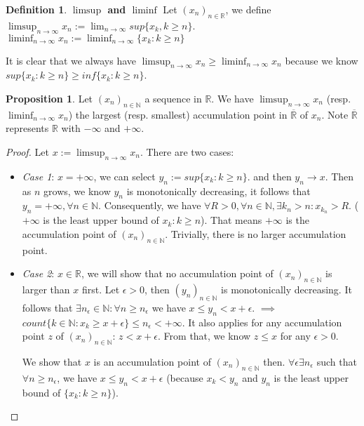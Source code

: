 \documentclass{article}
\theoremstyle{definition}
\newtheorem{defi}{Definition}[subsection]
\newtheorem{prop}{Proposition}[subsection]
\begin{document}
\begin{defi}
\textbf{$\limsup$ and $\liminf$} Let $(x_n)_{n\in\mathbb{R}}$, we define $\limsup_{n\to\infty}x_n := \lim_{n\to\infty}sup\{x_k, k\geq n\}$. $\liminf_{n\to\infty}x_n := \liminf_{n\to\infty}\{x_k: k\geq n\}$
\end{defi}

It is clear that we always have $\limsup_{n\to\infty}x_n \geq \liminf_{n\to\infty}x_n$ because we know $sup\{x_k:k\geq n\} \geq inf\{x_k: k\geq n\}$.

\begin{prop}
Let $(x_n)_{n\in\mathbb{N}}$ a sequence in $\mathbb{R}$. We have $\limsup_{n\to\infty}x_n$ (resp. $\liminf_{n\to\infty}x_n$) the largest (resp. smallest) accumulation point in $\overline{\mathbb{R}}$ of $x_n$. Note $\overline{\mathbb{R}}$ represents $\mathbb{R}$ with $-\infty$ and $+\infty$.
\begin{proof}
Let $x:= \limsup_{n\to\infty}x_n$. There are two cases:
\begin{itemize}
    \item \textit{Case 1}: $x=+\infty$, we can select $y_n := sup\{x_k: k\geq n\}$. and then $y_n \to x$. Then as $n$ grows, we know $y_n$ is monotonically decreasing, it follows that $y_n=+\infty, \forall n\in\mathbb{N}$. Consequently, we have $\forall R>0, \forall n\in\mathbb{N}, \exists k_n>n : x_{k_n}>R$. ($+\infty$ is the least upper bound of ${x_k: k\geq n}$). That means $+\infty$ is the accumulation point of $(x_n)_{n\in\mathbb{N}}$. Trivially, there is no larger accumulation point.
    \item \textit{Case 2}: $x\in\mathbb{R}$, we will show that no accumulation point of $(x_n)_{n\in\mathbb{N}}$ is larger than $x$ first. Let $\epsilon>0$, then $(y_n)_{n\in\mathbb{N}}$ is monotonically decreasing. It follows that $\exists n_\epsilon\in\mathbb{N}: \forall n \geq n_\epsilon$ we have $ x\leq y_n < x + \epsilon$. $\implies$ $count\{k\in\mathbb{N}: x_k\geq x+\epsilon\}\leq n_\epsilon<+\infty$. It also applies for any accumulation point $z$ of $(x_n)_{n\in\mathbb{N}}$: $z<x+\epsilon$. From that, we know $z\leq x$ for any $\epsilon>0$. 
    
    We show that $x$ is an accumulation point of $(x_n)_{n\in\mathbb{N}}$ then. $\forall\epsilon \exists n_\epsilon$ such that $\forall n \geq n_\epsilon$, we have $x\leq y_n < x+\epsilon$ (because $x_k<y_n$ and $y_n$ is the least upper bound of $\{x_k: k\geq n\}$).
    

\end{itemize}
\end{proof}
\end{prop}
\end{document}
